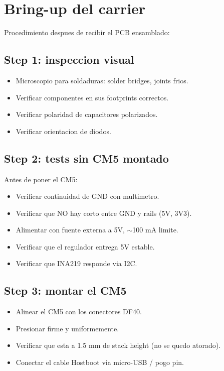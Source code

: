\documentclass[11pt,a4paper,oneside,openright]{book}
\begin{document}
\chapter{Bring-up del carrier}

Procedimiento despues de recibir el PCB ensamblado:

\section{Step 1: inspeccion visual}

\begin{itemize}[leftmargin=2em]
  \item Microscopio para soldaduras: solder bridges, joints frios.
  \item Verificar componentes en sus footprints correctos.
  \item Verificar polaridad de capacitores polarizados.
  \item Verificar orientacion de diodos.
\end{itemize}

\section{Step 2: tests sin CM5 montado}

Antes de poner el CM5:

\begin{itemize}[leftmargin=2em]
  \item Verificar continuidad de GND con multimetro.
  \item Verificar que NO hay corto entre GND y rails (5V, 3V3).
  \item Alimentar con fuente externa a 5V, $\sim$100 mA limite.
  \item Verificar que el regulador entrega 5V estable.
  \item Verificar que INA219 responde via I2C.
\end{itemize}

\section{Step 3: montar el CM5}

\begin{itemize}[leftmargin=2em]
  \item Alinear el CM5 con los conectores DF40.
  \item Presionar firme y uniformemente.
  \item Verificar que esta a 1.5 mm de stack height (no se quedo
        atorado).
  \item Conectar el cable Hostboot via micro-USB / pogo pin.
\end{itemize}
\end{document}
